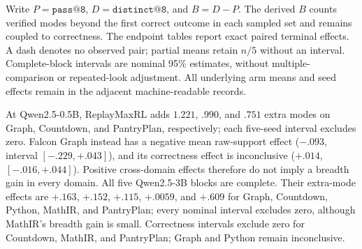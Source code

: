 \documentclass{article}
\newcommand{\1}{\mathbf 1}
\theoremstyle{remark}
\theoremstyle{definition}
\theoremstyle{plain}
\begin{document}
Write $P=\texttt{pass@8}$, $D=\texttt{distinct@8}$, and $B=D-P$.
The derived $B$ counts verified modes beyond the first correct outcome in
each sampled set and remains coupled to correctness. The endpoint tables
report exact paired terminal effects. A dash denotes no observed pair;
partial means retain $n/5$ without an interval. Complete-block intervals
are nominal 95\% estimates, without multiple-comparison or repeated-look
adjustment. All underlying arm means and seed effects remain in the
adjacent machine-readable records.

\begin{table}[H]
  \centering
  \caption{\textbf{ReplayMaxRL effects across model scales at pass 8.}
  All effects are ReplayMaxRL minus MaxRL on the displayed paired seeds.
  Brackets give paired Student-$t$ intervals for $\Delta B$ in complete blocks.
  The machine-readable report also retains both arm means, all per-seed
  effects, and intervals for $P$ and $D$.}
  \label{tab:current-e118}
  \scriptsize
  \setlength{\tabcolsep}{3pt}
\end{table}


At Qwen2.5-0.5B, ReplayMaxRL adds $1.221$, $.990$, and $.751$ extra modes
on Graph, Countdown, and PantryPlan, respectively; each five-seed interval
excludes zero. Falcon Graph instead has a negative mean raw-support effect
($-.093$, interval $[-.229,+.043]$), and its correctness effect is inconclusive
($+.014$, $[-.016,+.044]$). Positive cross-domain effects therefore do not
imply a breadth gain in every domain. All five Qwen2.5-3B blocks are complete. Their extra-mode effects are
$+.163$, $+.152$, $+.115$, $+.0059$, and $+.609$ for Graph, Countdown,
Python, MathIR, and PantryPlan; every nominal interval excludes zero,
although MathIR's breadth gain is small. Correctness intervals exclude zero
for Countdown, MathIR, and PantryPlan; Graph and Python remain inconclusive.
\end{document}
